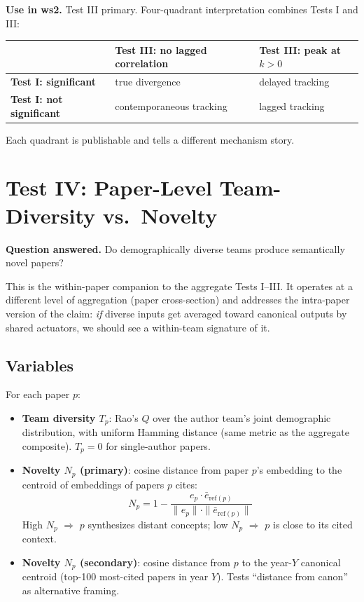 \documentclass[11pt]{article}
\begin{document}
\textbf{Use in ws2.} Test III primary. Four-quadrant interpretation
combines Tests I and III:

\begin{center}
\begin{tabular}{lll}
  \toprule
  & \textbf{Test III: no lagged correlation} & \textbf{Test III: peak at $k > 0$} \\
  \midrule
  \textbf{Test I: significant} & true divergence & delayed tracking \\
  \textbf{Test I: not significant} & contemporaneous tracking & lagged tracking \\
  \bottomrule
\end{tabular}
\end{center}

Each quadrant is publishable and tells a different mechanism story.

\section{Test IV: Paper-Level Team-Diversity vs.\ Novelty}
\label{sec:test-iv}

\textbf{Question answered.} Do demographically diverse teams produce
semantically novel papers?

This is the within-paper companion to the aggregate Tests I--III.
It operates at a different level of aggregation (paper cross-section)
and addresses the intra-paper version of the claim: \textit{if} diverse
inputs get averaged toward canonical outputs by shared actuators, we
should see a within-team signature of it.

\subsection{Variables}

For each paper $p$:
\begin{itemize}[nosep]
  \item \textbf{Team diversity $T_p$}: Rao's $Q$ over the author team's
    joint demographic distribution, with uniform Hamming distance
    (same metric as the aggregate composite). $T_p = 0$ for single-author
    papers.
  \item \textbf{Novelty $N_p$ (primary)}: cosine distance from paper
    $p$'s embedding to the centroid of embeddings of papers $p$ cites:
    \[
      N_p = 1 - \frac{e_p \cdot \bar e_{\text{ref}(p)}}
      {\|e_p\| \cdot \|\bar e_{\text{ref}(p)}\|}
    \]
    High $N_p$ $\Rightarrow$ $p$ synthesizes distant concepts; low
    $N_p$ $\Rightarrow$ $p$ is close to its cited context.
  \item \textbf{Novelty $N_p$ (secondary)}: cosine distance from $p$
    to the year-$Y$ canonical centroid (top-100 most-cited papers in
    year $Y$). Tests ``distance from canon'' as alternative framing.
\end{itemize}
\end{document}
